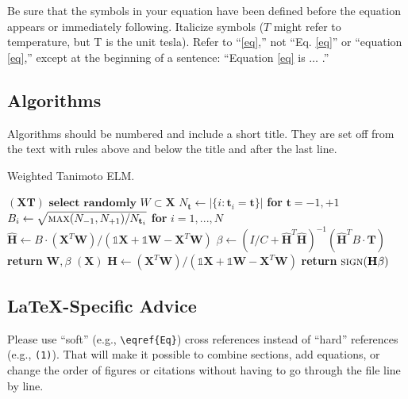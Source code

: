 \documentclass[journal,twoside,web]{ieeecolor}
\begin{document}
Be sure that the symbols in your equation have been defined before the 
equation appears or immediately following. Italicize symbols ($T$ might refer 
to temperature, but T is the unit tesla). Refer to ``\eqref{eq},'' not ``Eq. \eqref{eq}'' 
or ``equation \eqref{eq},'' except at the beginning of a sentence: ``Equation \eqref{eq} 
is $\ldots$ .''


\subsection{Algorithms}
Algorithms should be numbered and include a short title.
They are set off from the text with rules above and below the title and after the last line.
\begin{algorithm}[H]
\caption{Weighted Tanimoto ELM.}\label{alg:alg1}
\begin{algorithmic}
\STATE 
{}$(\mathbf{X} \mathbf{T})$
\STATE \hspace{0.5cm}$ \textbf{select randomly } W \subset \mathbf{X}  $
\STATE \hspace{0.5cm}$ N_\mathbf{t} \gets | \{ i : \mathbf{t}_i = \mathbf{t} \} | $ \textbf{ for } $ \mathbf{t}= -1,+1 $
\STATE \hspace{0.5cm}$ B_i \gets \sqrt{ \textsc{max}(N_{-1},N_{+1}) / N_{\mathbf{t}_i} } $ \textbf{ for } $ i = 1,...,N $
\STATE \hspace{0.5cm}$ \hat{\mathbf{H}} \gets  B \cdot (\mathbf{X}^T\textbf{W})/( \mathbb{1}\mathbf{X} + \mathbb{1}\textbf{W} - \mathbf{X}^T\textbf{W} ) $
\STATE \hspace{0.5cm}$ \beta \gets \left ( I/C + \hat{\mathbf{H}}^T\hat{\mathbf{H}} \right )^{-1}(\hat{\mathbf{H}}^T B\cdot \mathbf{T})  $
\STATE \hspace{0.5cm}\textbf{return} $\textbf{W},  \beta $
\STATE 
{}$(\mathbf{X} )$
\STATE \hspace{0.5cm}$ \mathbf{H} \gets  (\mathbf{X}^T\textbf{W} )/( \mathbb{1}\mathbf{X}  + \mathbb{1}\textbf{W}- \mathbf{X}^T\textbf{W}  ) $
\STATE \hspace{0.5cm}\textbf{return}  $\textsc{sign}( \mathbf{H} \beta )$
\end{algorithmic}
\label{alg1}
\end{algorithm}
\subsection{\LaTeX-Specific Advice}

Please use ``soft'' (e.g., \verb|\eqref{Eq}|) cross references instead
of ``hard'' references (e.g., \verb|(1)|). That will make it possible
to combine sections, add equations, or change the order of figures or
citations without having to go through the file line by line.
\end{document}
